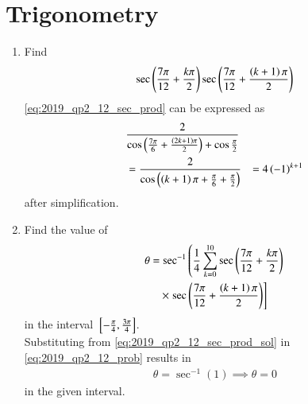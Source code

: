 \documentclass[journal,12pt,twocolumn]{IEEEtran}
\renewcommand\thesection{\arabic{section}}
\begin{document}
\section{Trigonometry}
\begin{enumerate}[label=\thesection.\arabic*
,ref=\thesection.\theenumi]
\item Find 
\begin{align}
\label{eq:2019_qp2_12_sec_prod}
\sec\left(\frac{7\pi}{12}+\frac{k\pi}{2}\right)
\sec\left(\frac{7\pi}{12}+\frac{\left(k+1\right)\pi}{2}\right)
\end{align}
%
\solution \eqref{eq:2019_qp2_12_sec_prod} can be expressed as
\begin{align}
&\frac{2}{\cos \left(\frac{7\pi}{6}+\frac{\left(2k+1\right)\pi}{2}\right)+ \cos \frac{\pi}{2}}
\nonumber \\
&=\frac{2}{\cos \left(\left(k+1\right)\pi+\frac{\pi}{6}+\frac{\pi}{2}\right)}
&=4\left(-1\right)^{k+1}
\label{eq:2019_qp2_12_sec_prod_sol}
\end{align}
%
after simplification.
\item Find the value of 
\begin{multline}
\label{eq:2019_qp2_12_prob}
\theta = \sec^{-1}\left( \frac{1}{4}\sum_{k=0}^{10}\sec\left(\frac{7\pi}{12}+\frac{k\pi}{2}\right)\right.
\\
\times {}\left.\sec\left(\frac{7\pi}{12}+\frac{\left(k+1\right)\pi}{2}\right)\right]
\end{multline}
%
in the interval ${}\left[-\frac{\pi}{4},\frac{3\pi}{4}\right]$.
%
\\
\solution Substituting from \eqref{eq:2019_qp2_12_sec_prod_sol} in \eqref{eq:2019_qp2_12_prob} results in 
\begin{align}
\theta = \sec^{-1}(1) \implies \theta = 0
\end{align}
%
in the given interval.
\end{enumerate}
\end{document}
